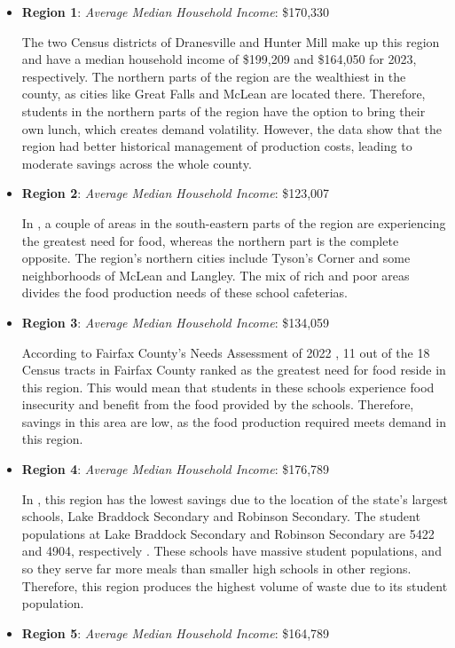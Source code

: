 \documentclass[journal]{IEEEtran}
\begin{document}
\begin{itemize}
    \item \textbf{Region 1}: \textit{Average Median Household Income}: \$170,330 \cite{fcps_income}
    
    The two Census districts of Dranesville and Hunter Mill make up this region and have a median household income of \$199,209 \cite{census_dranesville} and \$164,050 \cite{census_hunter_mill} for 2023, respectively. The northern parts of the region are the wealthiest in the county, as cities like Great Falls and McLean are located there. Therefore, students in the northern parts of the region have the option to bring their own lunch, which creates demand volatility. However, the data show that the region had better historical management of production costs, leading to moderate savings across the whole county.
    \item \textbf{Region 2}: \textit{Average Median Household Income}: \$123,007 \cite{fcps_income}
    
    In \cite{fcps_needs}, a couple of areas in the south-eastern parts of the region are experiencing the greatest need for food, whereas the northern part is the complete opposite. The region's northern cities include Tyson's Corner and some neighborhoods of McLean and Langley. The mix of rich and poor areas divides the food production needs of these school cafeterias.
    \item \textbf{Region 3}: \textit{Average Median Household Income}: \$134,059 \cite{fcps_income}
    
    According to Fairfax County's Needs Assessment of 2022 \cite{fcps_needs}, 11 out of the 18 Census tracts in Fairfax County ranked as the greatest need for food reside in this region. This would mean that students in these schools experience food insecurity and benefit from the food provided by the schools. Therefore, savings in this area are low, as the food production required meets demand in this region. 
    \item \textbf{Region 4}: \textit{Average Median Household Income}: \$176,789 \cite{fcps_income}
    
    In \cite{fcps_region4}, this region has the lowest savings due to the location of the state's largest schools, Lake Braddock Secondary and Robinson Secondary. The student populations at Lake Braddock Secondary and Robinson Secondary are 5422 and 4904, respectively \cite{fcps_profiles}. These schools have massive student populations, and so they serve far more meals than smaller high schools in other regions. Therefore, this region produces the highest volume of waste due to its student population.
    \item \textbf{Region 5}: \textit{Average Median Household Income}: \$164,789 \cite{fcps_income}
    

\end{itemize}
\end{document}
